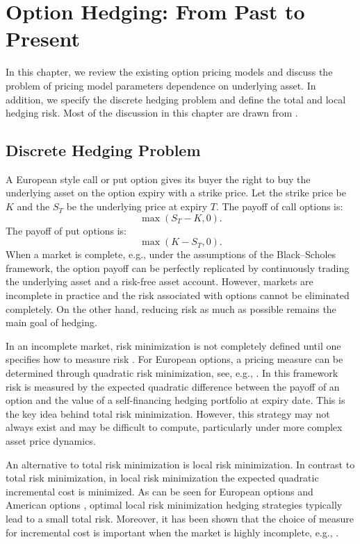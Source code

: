 \documentclass[letterpaper,12pt,titlepage,oneside,final]{book}
\numberwithin{equation}{section}
\theoremstyle{definition}
\begin{document}
\chapter{Option Hedging: From Past to Present}
\label{sec:Background} 
In this chapter, we review the existing option pricing models and discuss the problem of pricing model parameters dependence on underlying asset.  In addition, we specify the discrete hedging problem and define the total and local hedging risk. Most of the discussion in this chapter are drawn from \cite{shreve2004stochastic,heston1993closed,bartlett2006hedging,hagan2017bartlett,hagan2002managing}. 




\section{Discrete Hedging Problem}
\label{sec:DiscreteHedgingCriteria}
 A European style call or put option gives its buyer the right to buy the underlying asset on the option expiry with a strike price. Let the strike price be $K$ and  the $S_T$ be the underlying price at expiry $T$. The payoff of call options is:
\[
\max(S_T-K,0).
\]
The payoff of put options is:
\[
\max(K-S_T,0).
\]
When a market is complete, e.g., under the assumptions of the Black–Scholes framework, the option payoff can be perfectly replicated by continuously trading the underlying asset and a risk-free asset account. However, markets are incomplete in practice and
the risk associated with options cannot be eliminated completely. On the other hand, reducing risk as much as possible remains the main goal of hedging.

In an incomplete market, risk minimization is not completely defined until one specifies how to measure risk \cite{follmer1999quantile,follmer2000efficient,schweizerguided,el1995dynamic}. For European options, a pricing measure
can be determined through quadratic risk minimization, see, e.g., \cite{schweizer1995variance,schweizerguided,coleman2007total}. In this framework risk is measured by the expected quadratic difference between the payoff of an option and the value of a self-financing hedging portfolio at expiry date. This is the key idea behind total risk minimization. However, this strategy may not always exist and may be difficult to compute, particularly under more complex asset price dynamics\cite{coleman2003discrete,coleman2007discrete}.

An alternative to total risk minimization is local risk minimization. In contrast to total risk minimization, in local risk minimization the expected quadratic incremental cost is minimized.
As can be seen for European options \cite{coleman2003discrete} and American options \cite{coleman2007discrete} , optimal local risk minimization hedging strategies typically lead to a small total risk. Moreover, it has been shown that the choice of measure for incremental cost is important when the market is highly incomplete, e.g., \cite{coleman2003discrete,coleman2007discrete}. 
\end{document}
